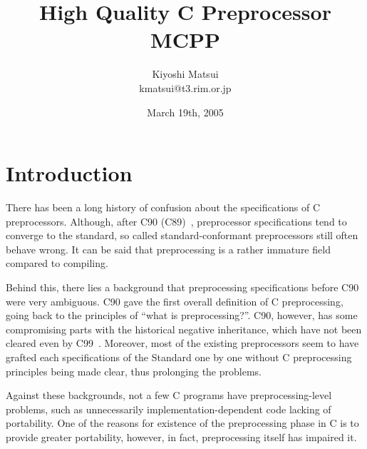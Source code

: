 \documentclass[twocolumn]{article}
\begin{document}
\title{High Quality C Preprocessor MCPP}
\author{Kiyoshi Matsui\\
{\normalsize kmatsui@t3.rim.or.jp}}
\date{March 19th, 2005}
\maketitle


\section{Introduction}

There has been a long history of confusion about the specifications of C preprocessors.  Although, after C90 (C89)~\cite{C90a,C90b,C90c,C90d}, preprocessor specifications tend to converge to the standard, so called standard-conformant preprocessors still often behave wrong.  It can be said that preprocessing is a rather immature field compared to compiling.

Behind this, there lies a background that preprocessing specifications before C90 were very ambiguous.  C90 gave the first overall definition of C preprocessing, going back to the principles of ``what is preprocessing?''.  C90, however, has some compromising parts with the historical negative inheritance, which have not been cleared even by C99~\cite{C99a,C99b,C99c}.  Moreover, most of the existing preprocessors seem to have grafted each specifications of the Standard one by one without C preprocessing principles being made clear, thus prolonging the problems.  

Against these backgrounds, not a few C programs have preprocessing-level problems, such as unnecessarily implementation-dependent code lacking of portability.  One of the reasons for existence of the preprocessing phase in C is to provide greater portability, however, in fact, preprocessing itself has impaired it.
\end{document}
